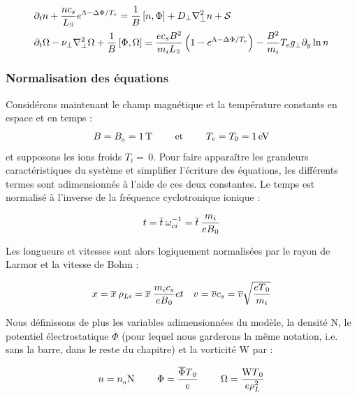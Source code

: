 \begin{refsection}
\begin{align}
\label{2-eqContinuiteMoyenne}
&\partial_t n + \frac{nc_s}{L_\para}e^{\Lambda-\Delta \Phi/T_e} =
\frac{1}{B}\left[n,\Phi\right] + D_\perp\nabla^2_\perp n + \mathcal{S}\\
&\partial_{t}\Omega - \nu_\perp
\nabla_\perp^2\Omega+
\frac{1}{B}\left[\Phi,\Omega\right]=\frac{ec_sB^2}{m_iL_\para}\left(1-e^{\Lambda-\Delta
\Phi/T_e}\right) -\frac{B^2}{m_i}T_eg_\perp\partial_y\ln n
\label{2-eqCourantMoyenne}
\end{align}
 
\subsubsection{Normalisation des équations}

Considérons maintenant le champ magnétique et la température constants en espace
et en temps :
\begin{equation}
B=B_{{_{0}}}=1\,\text{T~~~~~~~et~~~~~~~}T_e=T_0=1\,\text{eV}
\end{equation}
et supposons les
ions froids $T_i=\,$0.
Pour faire apparaître les grandeurs caractéristiques du système et simplifier
l'écriture des équations, les différents termes sont adimensionnés à
l'aide de ces deux constantes. Le temps est normalisé à l'inverse de la
fréquence cyclotronique ionique :

\begin{equation}
t = \overline{t}\:\omega_{ci}^{{-1}} =
\overline{t}\:\frac{m_i}{eB{_{0}}}
\end{equation}

Les longueurs et vitesses sont alors logiquement normalisées par le rayon de
Larmor et la vitesse de Bohm :

\begin{eqnarray}
x = \overline{x}\:\rho_{Li} =
\overline{x}\:\frac{m_ic_s}{eB{_{0}}} &
et &
v=\overline{v}c_s=\overline{v}\sqrt{\frac{eT{_{0}}}{m_i}}
\end{eqnarray}

Nous définissons de plus les variables adimensionnées du modèle, la densité
$\text{N}$, le potentiel électrostatique $\overline{\Phi}$ (pour lequel nous
garderons la même notation, i.e. sans la barre, dans le reste du chapitre) et la
vorticité $\text{W}$ par :

\begin{eqnarray}
n = n_{{_{0}}}\text{N} \text{~~~~~~~} \Phi=\frac{\overline{\Phi}
T{_{0}}}{e}
\text{~~~~~~~} \Omega=\frac{\text{W} T{_{0}}}{e\rho_L^2}
\end{eqnarray}


\end{refsection}
